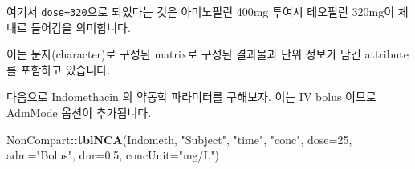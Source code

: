 \documentclass[12pt,]{krantz}
\newenvironment{Shaded}{\begin{snugshade}}{\end{snugshade}}
\newcommand{\KeywordTok}[1]{\textcolor[rgb]{0.13,0.29,0.53}{\textbf{#1}}}
\newcommand{\DataTypeTok}[1]{\textcolor[rgb]{0.13,0.29,0.53}{#1}}
\newcommand{\DecValTok}[1]{\textcolor[rgb]{0.00,0.00,0.81}{#1}}
\newcommand{\FloatTok}[1]{\textcolor[rgb]{0.00,0.00,0.81}{#1}}
\newcommand{\StringTok}[1]{\textcolor[rgb]{0.31,0.60,0.02}{#1}}
\newcommand{\OperatorTok}[1]{\textcolor[rgb]{0.81,0.36,0.00}{\textbf{#1}}}
\newcommand{\NormalTok}[1]{#1}
\theoremstyle{definition}
\theoremstyle{definition}
\theoremstyle{definition}
\theoremstyle{remark}
\begin{document}
여기서 \texttt{dose=320}으로 되었다는 것은 아미노필린 400mg 투여시
테오필린 320mg이 체내로 들어감을 의미합니다.

이는 문자(character)로 구성된 matrix로 구성된 결과물과 단위 정보가 담긴
attribute를 포함하고 있습니다.

다음으로 Indomethacin 의 약동학 파라미터를 구해보자. 이는 IV bolus
이므로 AdmMode 옵션이 추가됩니다.

\begin{Shaded}
\begin{Highlighting}[]
\NormalTok{NonCompart}\OperatorTok{::}\KeywordTok{tblNCA}\NormalTok{(Indometh, }\StringTok{"Subject"}\NormalTok{, }\StringTok{"time"}\NormalTok{, }\StringTok{"conc"}\NormalTok{, }\DataTypeTok{dose=}\DecValTok{25}\NormalTok{, }\DataTypeTok{adm=}\StringTok{"Bolus"}\NormalTok{, }\DataTypeTok{dur=}\FloatTok{0.5}\NormalTok{, }\DataTypeTok{concUnit=}\StringTok{"mg/L"}\NormalTok{)}
\end{Highlighting}
\end{Shaded}
\end{document}
